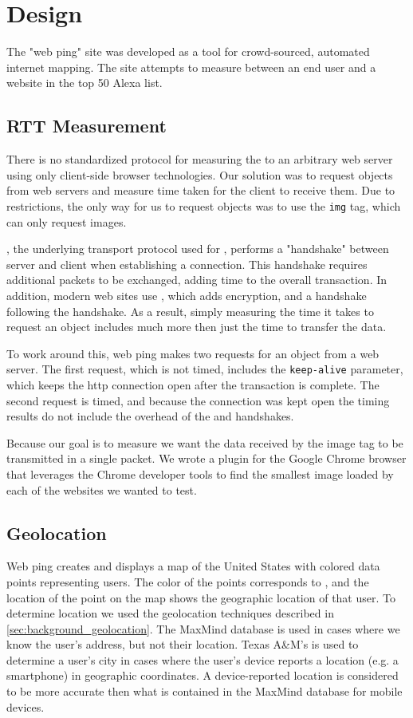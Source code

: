 \section{Design}\label{sec:design_web_ping}
The "web ping" site was developed as a tool for crowd-sourced, automated internet mapping. The site attempts to measure \rtt between an end user and a website in the top 50 Alexa list. 

\subsection{RTT Measurement}
There is no standardized protocol for measuring the \rtt to an arbitrary web server using only client-side browser technologies. Our solution was to request objects from web servers and measure time taken for the client to receive them. Due to \cors restrictions, the only way for us to request objects was to use the \html \texttt{img} tag, which can only request images.

\TCP, the underlying transport protocol used for \http, performs a "handshake" between server and client when establishing a connection. This handshake requires additional packets to be exchanged, adding time to the overall transaction. In addition, modern web sites use \httpse, which adds \tls encryption, and a \tls handshake following the \tcp handshake. As a result, simply measuring the time it takes to request an object includes much more then just the time to transfer the data.

To work around this, web ping makes two requests for an object from a web server. The first request, which is not timed, includes the \http \texttt{keep-alive} parameter, which keeps the http connection open after the transaction is complete. The second request is timed, and because the connection was kept open the timing results do not include the overhead of the \tcp and \tls handshakes.

Because our goal is to measure \rtt we want the data received by the image tag to be transmitted in a single packet. We wrote a plugin for the Google Chrome browser that leverages the Chrome developer tools \api to find the smallest image loaded by each of the websites we wanted to test.

\subsection{Geolocation}
Web ping creates and displays a map of the United States with colored data points representing users. The color of the points corresponds to \rtt, and the location of the point on the map shows the geographic location of that user. To determine location we used the geolocation techniques described in \cref{sec:background_geolocation}. The MaxMind database is used in cases where we know the user's \ip address, but not their location. Texas A\&M's \api is used to determine a user's city in cases where the user's device reports a location (e.g. a smartphone) in geographic coordinates. A device-reported location is considered to be more accurate then what is contained in the MaxMind database for mobile devices.

